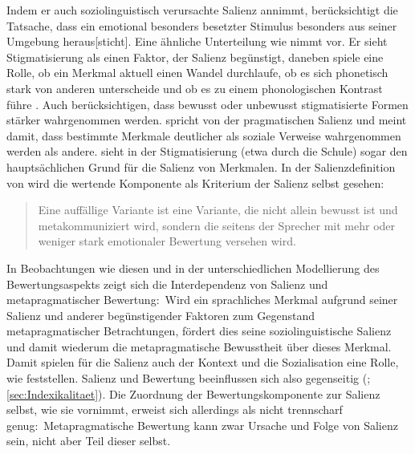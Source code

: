 Indem er auch soziolinguistisch verursachte Salienz annimmt, berücksichtigt \citet[10]{Auer2014} die Tatsache, dass \glqq ein emotional besonders besetzter Stimulus besonders aus seiner Umgebung heraus[sticht]\grqq.
Eine ähnliche Unterteilung wie \citet{Auer2014} nimmt \citet[11]{Trudgill1986} vor. 
Er sieht Stigmatisierung als einen Faktor, der Salienz begünstigt, daneben spiele eine Rolle, ob ein Merkmal aktuell einen Wandel durchlaufe, ob es sich phonetisch stark von anderen unterscheide und ob es zu einem phonologischen Kontrast führe \citep[s.][11]{Trudgill1986}. 
Auch \citet[121]{Elmentaler2010} berücksichtigen, dass bewusst oder unbewusst stigmatisierte Formen stärker wahrgenommen werden.
\citet[294--295]{Errington.1985} spricht von der pragmatischen Salienz und meint damit, dass bestimmte Merkmale deutlicher als soziale Verweise wahrgenommen werden als andere. 
\citet[184]{Mihm.1985} sieht in der Stigmatisierung (etwa durch die Schule) sogar den haupts{\"a}chlichen Grund f{\"u}r die Salienz von Merkmalen. 
In der Salienzdefinition von \citet[]{Lenz2010} wird die wertende Komponente als Kriterium der Salienz selbst gesehen: 
\begin{quote}Eine auffällige Variante ist eine Variante, die nicht allein bewusst ist und metakommuniziert wird, sondern die seitens der Sprecher mit mehr oder weniger stark emotionaler Bewertung versehen wird. \citep[200]{Lenz2010}\end{quote}
In Beobachtungen wie diesen und in der unterschiedlichen Modellierung des Bewertungsaspekts zeigt sich die Interdependenz von Salienz und metapragmatischer Bewertung:~Wird ein sprachliches Merkmal aufgrund seiner Salienz und anderer begünstigender Faktoren zum Gegenstand metapragmatischer Betrachtungen, fördert dies seine soziolinguistische Salienz und damit wiederum die metapragmatische Bewusstheit über dieses Merkmal. 
Damit spielen für die Salienz auch der Kontext und die Sozialisation eine Rolle, wie \citet[135]{Elmentaler2010} feststellen. 
Salienz und Bewertung beeinflussen sich also gegenseitig (\cites[s.][58]{Hickey2000}[163f]{Hettler.2013}; \autoref{sec:Indexikalitaet}).  
Die Zuordnung der Bewertungskomponente zur Salienz selbst, wie \citet{Lenz.2003} sie vornimmt, erweist sich allerdings als nicht trennscharf genug:~Metapragmatische Bewertung kann zwar Ursache und Folge von Salienz sein, nicht aber Teil dieser selbst. 


